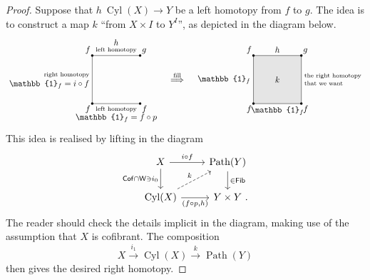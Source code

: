 \begin{proof}
    Suppose that $h\:\operatorname{Cyl}(X)\to Y$ be a left homotopy from $f$ to $g$.
    The idea is to construct a map $k$ ``from $X\times I$ to $Y^I$'',
    as depicted in the diagram below.
    \[ \begin{tikzpicture}[baseline=(base.base)]
        \draw (2,2)--(0,2)--(0,0)--(2,0);
        \fill (0,0) circle (.05);
        \fill (0,2) circle (.05);
        \fill (2,0) circle (.05);
        \fill (2,2) circle (.05);
        
        \node[anchor=south east,inner sep=2pt] at (0,2) {$f$};
        \node[anchor=north east,inner sep=2pt] at (0,0) {$f$};
        \node[anchor=north west,inner sep=2pt] at (2,0) {$f$};
        \node[anchor=south west,inner sep=2pt] at (2,2) {$g$};
        \node[anchor=south] at (1,2) {\scriptsize left homotopy};
        \node[anchor=south] at (1,2.3) {$h$};
        \node[anchor=east] at (0,1.2) {\scriptsize right homotopy};
        \node[anchor=east] at (0,.8) {$\mathbb{1}_f=i \circ f$};
        \node[anchor=north] at (1,0) {\scriptsize left homotopy};
        \node[anchor=north] at (1,-.3) {$\mathbb{1}_f=f \circ p$};
        \node(base) at (0,1) {\phantom{0}};
    \end{tikzpicture} 
    \quad \overset{\text{fill}}{\Longrightarrow} \quad
    \begin{tikzpicture}[baseline=(base.base)]
        \fill[black!10] (0,0) rectangle (2,2);
        \draw (2,2)--(0,2)--(0,0)--(2,0)--cycle;
        \fill (0,0) circle (.05);
        \fill (0,2) circle (.05);
        \fill (2,0) circle (.05);
        \fill (2,2) circle (.05);
        
        \node[anchor=south east,inner sep=2pt] at (0,2) {$f$};
        \node[anchor=north east,inner sep=2pt] at (0,0) {$f$};
        \node[anchor=north west,inner sep=2pt] at (2,0) {$f$};
        \node[anchor=south west,inner sep=2pt] at (2,2) {$g$};
        \node[anchor=south] at (1,2) {$h$};
        \node[anchor=east] at (0,1) {$\mathbb{1}_f$};
        \node[anchor=north] at (1,0) {$\mathbb{1}_f$};
        \node[anchor=west] at (2,1.15) {\scriptsize the right homotopy};
        \node[anchor=west] at (2,.85) {\scriptsize that we want};
        \node at (1,1) {$k$};
        \node(base) at (0,1) {\phantom{0}};
    \end{tikzpicture} \]
    This idea is realised by lifting in the diagram
    \[ \begin{tikzcd}
        X \ar[d,"\cat{Cof}\cap\cat{W} \ni i_0"'] \ar[r,"i\circ f"] &
        \operatorname{Path}(Y) \ar[d,"\in\cat{Fib}"] \\
        \operatorname{Cyl}(X) \ar[r,"(f\circ p\comma h)"'] \ar[ur,dashed,"k"] &
        Y \times Y \rlap{\ .}
    \end{tikzcd} \]
    The reader should check the details implicit in the diagram,
    making use of the assumption that $X$ is cofibrant.
    The composition
    \[ X \xrightarrow{i_1} \operatorname{Cyl}(X) \xrightarrow{k} \operatorname{Path}(Y) \]
    then gives the desired right homotopy.


\end{proof}

